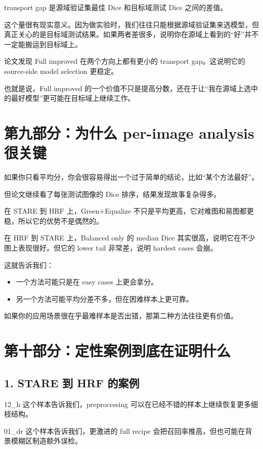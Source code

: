 \documentclass[12pt,a4paper]{ctexart}
\begin{document}
transport gap 是源域验证集最佳 Dice 和目标域测试 Dice 之间的差值。

这个量很有现实意义。因为做实验时，我们往往只能根据源域验证集来选模型，但真正关心的是目标域测试结果。如果两者差很多，说明你在源域上看到的“好”并不一定能搬运到目标域上。

论文发现 Full improved 在两个方向上都有更小的 transport gap。这说明它的 source-side model selection 更稳定。

也就是说，Full improved 的一个价值不只是提高分数，还在于让“我在源域上选中的最好模型”更可能在目标域上继续工作。

\section*{第九部分：为什么 per-image analysis 很关键}

如果你只看平均分，你会很容易得出一个过于简单的结论，比如“某个方法最好”。

但论文继续看了每张测试图像的 Dice 排序，结果发现故事复杂得多。

在 STARE 到 HRF 上，Green+Equalize 不只是平均更高，它对难图和易图都更稳，所以它的优势不是偶然的。

在 HRF 到 STARE 上，Balanced only 的 median Dice 其实很高，说明它在不少图上表现很好。但它的 lower tail 非常差，说明 hardest cases 会崩。

这就告诉我们：

\begin{itemize}[leftmargin=1.6em]
  \item 一个方法可能只是在 easy cases 上更会拿分。
  \item 另一个方法可能平均分差不多，但在困难样本上更可靠。
\end{itemize}

如果你的应用场景很在乎最难样本是否出错，那第二种方法往往更有价值。

\section*{第十部分：定性案例到底在证明什么}

\subsection*{1. STARE 到 HRF 的案例}

12\_h 这个样本告诉我们，preprocessing 可以在已经不错的样本上继续恢复更多细枝结构。

01\_dr 这个样本告诉我们，更激进的 full recipe 会把召回率推高，但也可能在背景模糊区制造额外误检。
\end{document}
